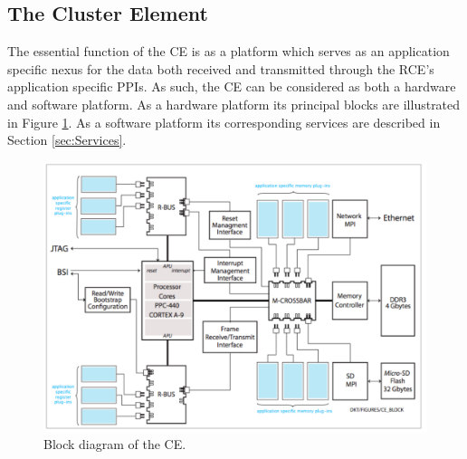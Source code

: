 \subsection{The Cluster Element}
\label{sec:CE}
The essential function of the CE is as a platform 
which serves as an application specific nexus for the 
data both received and transmitted through the RCE's application specific PPIs. 
As such, the CE can be considered as both a hardware and software platform. 
As a hardware platform its principal blocks are illustrated in 
Figure \ref{fig:CEblock}. 
As a software platform its corresponding services are described in Section \ref{sec:Services}.


\begin{figure}[tbh]
\includegraphics[scale=0.8]{ce-block.pdf}
\caption{Block diagram of the CE.}
\label{fig:CEblock}
\end{figure} 


